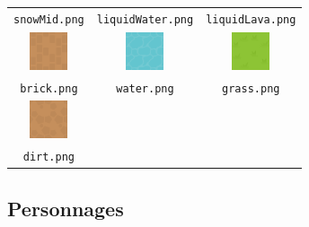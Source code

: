 {\begin{center}
\begin{tabular}{c c c}
	\texttt{\footnotesize snowMid.png} & \texttt{\footnotesize liquidWater.png} & \texttt{\footnotesize liquidLava.png} \\
	\includegraphics[width=3em]{sprites/terrain/brick.png} & \includegraphics[width=3em]{sprites/terrain/water.png} & \includegraphics[width=3em]{sprites/terrain/grass.png} \\
	\texttt{\footnotesize brick.png} & \texttt{\footnotesize water.png} & \texttt{\footnotesize grass.png} \\
	\includegraphics[width=3em]{sprites/terrain/dirt.png} &  &  \\
	\texttt{\footnotesize dirt.png} & & \\
\end{tabular}
\end{center}
}

\subsection{Personnages}

